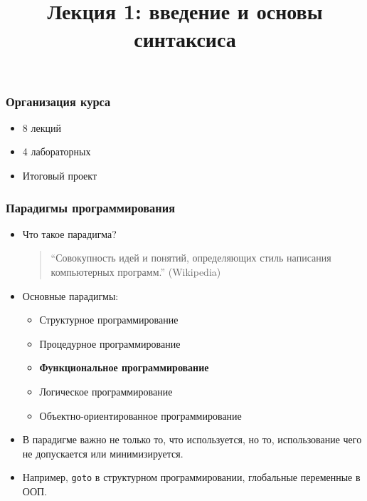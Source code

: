\documentclass[10pt]{beamer}
\title{Лекция 1: введение и основы синтаксиса}
\begin{document}
\begin{frame}[plain]
\maketitle
\end{frame}

\begin{frame}
\frametitle{Организация курса}
\begin{itemize}
    \item 8 лекций
    \item 4 лабораторных
    \item Итоговый проект
\end{itemize}
\end{frame}

\begin{frame}
\frametitle{Парадигмы программирования}
\begin{itemize}
\item Что такое парадигма?
\pause
\begin{quote}
\enquote{Совокупность идей и понятий, определяющих стиль написания компьютерных программ.} (Wikipedia)
\end{quote}
\pause
\item Основные парадигмы:
\pause
\begin{itemize}
    \item Структурное программирование
    \item Процедурное программирование
    \item \textbf{Функциональное программирование}
    \item Логическое программирование
    \item Объектно-ориентированное программирование
\end{itemize}
\pause
\item В парадигме важно не только то, что используется, но то, использование чего не допускается или минимизируется.
\pause
\item Например, \lstinline!goto! в структурном программировании, глобальные переменные в ООП.
\end{itemize}
\end{frame}
\end{document}
